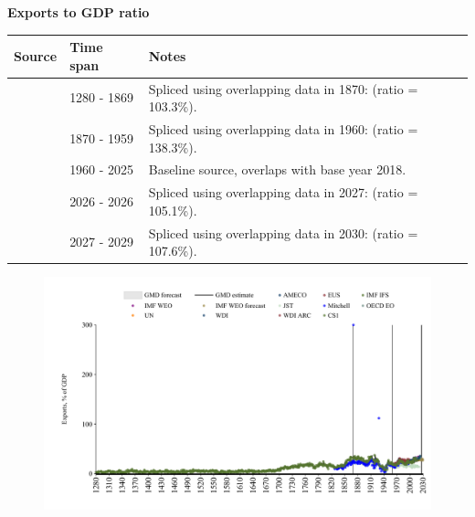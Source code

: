 \documentclass[12pt,a4paper,landscape]{article}
\begin{document}
\begin{adjustbox}{max totalsize={\paperwidth}{\paperheight},center}
\begin{minipage}[t][\textheight][t]{\textwidth}
\vspace*{0.5cm}
{}
\begin{center}
{\Large\bfseries Exports to GDP ratio}
\end{center}
\vspace{0.5cm}
\begin{table}[H]
\centering
\small
\begin{tabular}{|l|l|l|}
\hline
\textbf{Source} & \textbf{Time span} & \textbf{Notes} \\
\hline
\rowcolor{white}\cite{CS1_GBR}& 1280 - 1869 &Spliced using overlapping data in 1870: (ratio = 103.3\%). \\
\rowcolor{lightgray}\cite{JST}& 1870 - 1959 &Spliced using overlapping data in 1960: (ratio = 138.3\%). \\
\rowcolor{white}\cite{OECD_EO}& 1960 - 2025 &Baseline source, overlaps with base year 2018. \\
\rowcolor{lightgray}\cite{AMECO}& 2026 - 2026 &Spliced using overlapping data in 2027: (ratio = 105.1\%). \\
\rowcolor{white}\cite{IMF_WEO_forecast}& 2027 - 2029 &Spliced using overlapping data in 2030: (ratio = 107.6\%). \\
\hline
\end{tabular}
\end{table}
\begin{figure}[H]
\centering
\includegraphics[width=\textwidth,height=0.6\textheight,keepaspectratio]{graphs/GBR_exports_GDP.pdf}
\end{figure}
\end{minipage}
\end{adjustbox}
\end{document}
